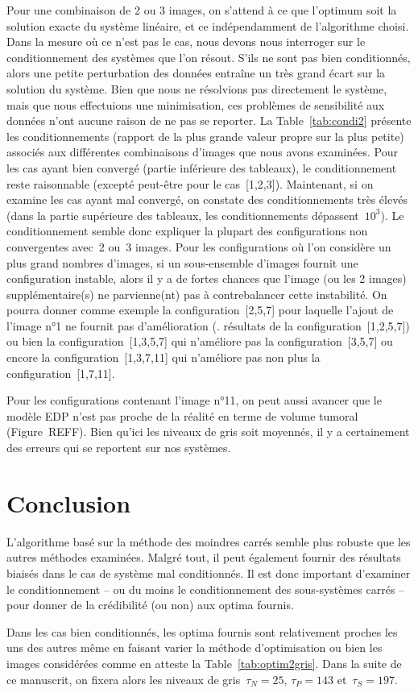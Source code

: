 \documentclass[main.tex]{subfiles}
\begin{document}
Pour une combinaison de 2 ou 3 images, on s'attend à ce que l'optimum soit la solution exacte du système linéaire, et ce indépendamment de l'algorithme choisi. Dans la mesure où ce n'est pas le cas, nous devons nous interroger sur le conditionnement des systèmes que l'on résout. S'ils ne 
sont pas bien conditionnés, alors une petite perturbation des données entraîne un très grand écart sur la solution du système. Bien que nous ne résolvions pas directement le système, mais que nous effectuions une minimisation, ces problèmes de sensibilité aux données n'ont aucune raison de ne pas se reporter. La Table~\ref{tab:condi2} présente les conditionnements (rapport de la plus grande valeur propre sur la plus petite) associés aux différentes combinaisons d'images que nous avons examinées. Pour les cas ayant bien convergé (partie inférieure des tableaux), le conditionnement reste raisonnable (excepté peut-être pour le cas~[1,2,3]). Maintenant, si on examine les cas ayant mal convergé, on constate des conditionnements très élevés (dans la partie supérieure des tableaux, les conditionnements dépassent~$10^3$). Le conditionnement semble donc expliquer la plupart des configurations non convergentes avec~2 ou~3 images. Pour les configurations où l'on considère un plus grand nombres d'images, si un sous-ensemble d'images fournit une configuration instable, alors il y a de fortes chances que l'image (ou les 2 images) supplémentaire(s) ne parvienne(nt) pas à contrebalancer cette instabilité. On pourra donner comme  exemple la configuration~[2,5,7] pour laquelle l'ajout de l'image n°1 ne fournit pas d'amélioration (\cf. résultats de la configuration~[1,2,5,7]) ou bien la configuration~[1,3,5,7] qui n'améliore pas la configuration~[3,5,7] ou encore la configuration~[1,3,7,11] qui n'améliore pas non plus la configuration~[1,7,11].


Pour les configurations contenant l'image n°11, on peut aussi avancer que le modèle EDP n'est pas proche de la réalité en terme de volume tumoral (\cf Figure~REFF). Bien qu'ici les niveaux de gris soit moyennés, il y a certainement des erreurs qui se reportent sur nos systèmes.

\section{Conclusion}
L'algorithme basé sur la méthode des moindres carrés semble plus robuste que les autres méthodes examinées. Malgré tout, il peut également fournir des résultats biaisés dans le cas de système mal conditionnés. Il est donc important d'examiner le conditionnement -- ou du moins le conditionnement des sous-systèmes carrés -- pour donner de la crédibilité (ou non) aux optima fournis.

Dans les cas bien conditionnés,  les optima fournis sont relativement proches les uns des autres même en faisant varier la méthode d'optimisation ou bien les images considérées comme en atteste la Table~\ref{tab:optim2gris}. Dans la suite de ce manuscrit, on fixera alors les niveaux de gris~$\tau_N=25$, $\tau_P=143$ et~$\tau_S=197$.
\end{document}
